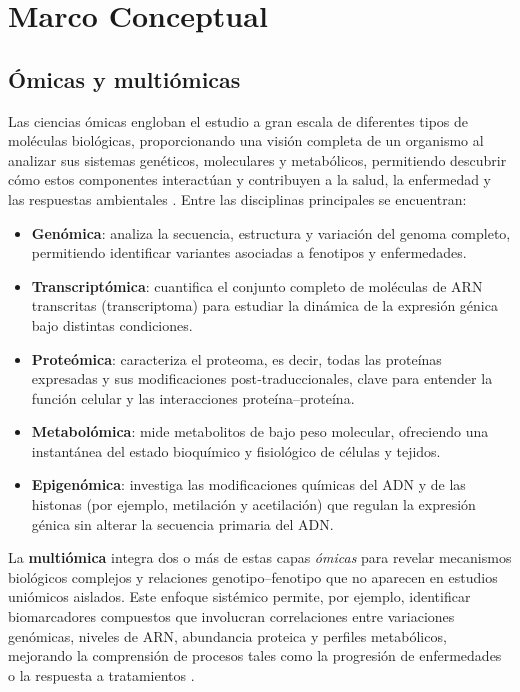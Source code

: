 \section{Marco Conceptual}

\subsection{Ómicas y multiómicas}
Las ciencias ómicas engloban el estudio a gran escala de diferentes tipos de moléculas biológicas, proporcionando una visión completa de un organismo al analizar sus sistemas genéticos, moleculares y metabólicos, permitiendo descubrir cómo estos componentes interactúan y contribuyen a la salud, la enfermedad y las respuestas ambientales \cite{SilicoGene_2024} \cite{Yamada_Okada_Wang_Basak_Koyama_2021} \cite{ExplainAIMethsMultiOmics}. Entre las disciplinas principales se encuentran:

\begin{itemize}
    \item \textbf{Genómica}: analiza la secuencia, estructura y variación del genoma completo, permitiendo identificar variantes asociadas a fenotipos y enfermedades.
    \item \textbf{Transcriptómica}: cuantifica el conjunto completo de moléculas de ARN transcritas (transcriptoma) para estudiar la dinámica de la expresión génica bajo distintas condiciones.
    \item \textbf{Proteómica}: caracteriza el proteoma, es decir, todas las proteínas expresadas y sus modificaciones post‑traduccionales, clave para entender la función celular y las interacciones proteína–proteína.
    \item \textbf{Metabolómica}: mide metabolitos de bajo peso molecular, ofreciendo una instantánea del estado bioquímico y fisiológico de células y tejidos.
    \item \textbf{Epigenómica}: investiga las modificaciones químicas del ADN y de las histonas (por ejemplo, metilación y acetilación) que regulan la expresión génica sin alterar la secuencia primaria del ADN.
\end{itemize}

La \textbf{multiómica} integra dos o más de estas capas \emph{ómicas} para revelar mecanismos biológicos complejos y relaciones genotipo–fenotipo que no aparecen en estudios uniómicos aislados. Este enfoque sistémico permite, por ejemplo, identificar biomarcadores compuestos que involucran correlaciones entre variaciones genómicas, niveles de ARN, abundancia proteica y perfiles metabólicos, mejorando la comprensión de procesos tales como la progresión de enfermedades o la respuesta a tratamientos
\cite{biao2025multiomics_review}
\cite{Krassowski_Das_Sahu_Misra_2025} \cite{Vilanova2016are_multiomics_enough}.\\

